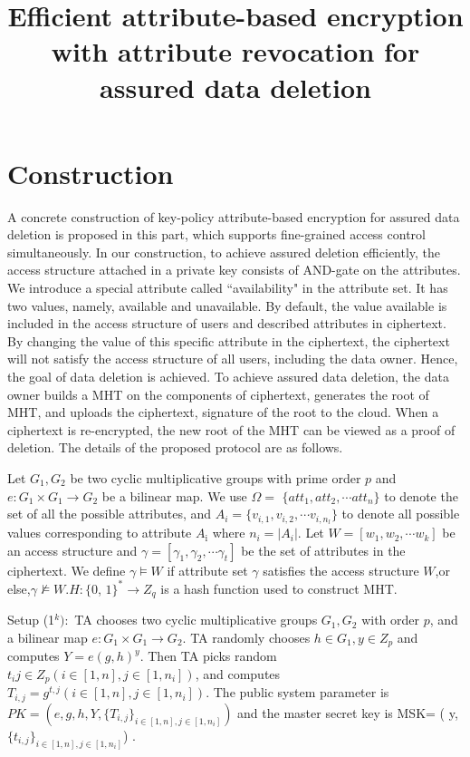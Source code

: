 \documentclass[runningheads]{llncs}
\begin{document}
\title{Efficient attribute-based encryption with attribute revocation for assured data deletion}
\section{Construction}
A concrete construction of key-policy attribute-based encryption for assured data deletion is proposed in this part, which supports fine-grained access control simultaneously. In our construction, to achieve assured deletion efficiently, the access structure attached in a private key consists of AND-gate on the attributes. We introduce a special attribute called “availability" in the attribute set. It has two values, namely, available and unavailable. By default, the value available is included in the access structure of users and described attributes in ciphertext. By changing the value of this specific attribute in the ciphertext, the ciphertext will not satisfy the access structure of all users, including the data owner. Hence, the goal of data deletion is achieved. To achieve assured data deletion, the data owner builds a MHT on the components of ciphertext, generates the root of MHT, and uploads the ciphertext, signature of the root to the cloud. When a ciphertext is re-encrypted, the new root of the MHT can be viewed as a proof of deletion. The details of the proposed protocol are as follows.

Let $G_1,G_2$ be two cyclic multiplicative groups with prime order $p$ and $e:G_1\times G_1\to G_2$ be a bilinear map. We use $\Omega=$ $\{att_1,att_2,\cdots att_n\}$ to denote the set of all the possible attributes, and $A_i=\{v_{i,1},v_{i,2},\cdots v_{i,n_l}\}$ to denote all possible values corresponding to attribute $A_{\mathrm{i}}$ where $n_i=|A_i|.$ Let $W=[w_1,w_2,\cdots w_k]$ be an access structure and $\gamma=[\gamma_1,\gamma_2,\cdots\gamma_t]$ be the set of attributes in the ciphertext. We define $\gamma\vDash W$ if attribute set $\gamma$ satisfies the access structure $W$,or else,$\gamma\not\models W.H:\{0$, $1\}^*\to Z_q$ is a hash function used to construct MHT.

Setup (1$^k):$ TA chooses two cyclic multiplicative groups $G_1,G_2$ with order $p$, and a bilinear map $e:G_1\times G_1\to G_2.$ TA randomly chooses $h\in G_1,y\in Z_p$ and computes $Y=e(g,h)^y.$ Then TA picks random $t_ij\in Z_p(i\in[1,n],j\in[1,n_i])$, and computes $T_{i,j}=g^{t,j}(i\in[1,n],j\in[1,n_{i}]).$ The public system parameter is $PK=(e,g,h,Y,\{T_{i,j}\}_{i\in[1,n],j\in[1,n_{i}]})$ and the master secret key is MSK= ( y, $\{ t_{i, j}\} _{i\in [ 1, n] , j\in [ 1, n_{i}] }$) .
\end{document}
